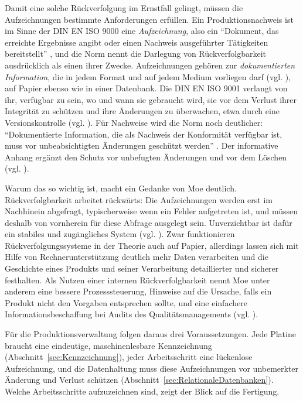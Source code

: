 Damit eine solche Rückverfolgung im Ernstfall gelingt, müssen die
Aufzeichnungen bestimmte Anforderungen erfüllen. Ein Produktionsnachweis ist im
Sinne der DIN EN ISO 9000 eine \emph{Aufzeichnung}, also ein \enquote{Dokument,
das erreichte Ergebnisse angibt oder einen Nachweis ausgeführter Tätigkeiten
bereitstellt} \cite[S.~26]{DINENISO9000_2026}, und die Norm nennt die Darlegung
von Rückverfolgbarkeit ausdrücklich als einen ihrer Zwecke. Aufzeichnungen
gehören zur \emph{dokumentierten Information}, die in jedem Format und auf jedem
Medium vorliegen darf (vgl. \cite[S.~26]{DINENISO9000_2026}), auf Papier ebenso
wie in einer Datenbank. Die DIN EN ISO 9001 verlangt von ihr, verfügbar zu sein,
wo und wann sie gebraucht wird, sie vor dem Verlust ihrer Integrität zu schützen
und ihre Änderungen zu überwachen, etwa durch eine Versionskontrolle (vgl.
\cite[S.~27]{DINENISO9001_2026}). Für Nachweise wird die Norm noch deutlicher:
\enquote{Dokumentierte Information, die als Nachweis der Konformität verfügbar
ist, muss vor unbeabsichtigten Änderungen geschützt werden}
\cite[S.~28]{DINENISO9001_2026}. Der informative Anhang ergänzt den Schutz vor
unbefugten Änderungen und vor dem Löschen (vgl.
\cite[S.~48]{DINENISO9001_2026}).

Warum das so wichtig ist, macht ein Gedanke von Moe deutlich. Rückverfolgbarkeit
arbeitet rückwärts: Die Aufzeichnungen werden erst im Nachhinein abgefragt,
typischerweise wenn ein Fehler aufgetreten ist, und müssen deshalb von vornherein
für diese Abfrage ausgelegt sein. Unverzichtbar ist dafür ein stabiles und
zugängliches System (vgl. \cite[S.~212]{moePerspectivesTraceabilityFood1998}). 
Zwar funktionieren Rückverfolgungssysteme in der Theorie auch auf Papier, 
allerdings lassen sich mit Hilfe von Rechnerunterstützung deutlich mehr Daten verarbeiten 
und die Geschichte eines Produkts und
seiner Verarbeitung detaillierter und sicherer festhalten. Als Nutzen einer internen
Rückverfolgbarkeit nennt Moe unter anderem eine bessere Prozesssteuerung,
Hinweise auf die Ursache, falls ein Produkt nicht den Vorgaben entsprechen sollte, und
eine einfachere Informationsbeschaffung bei Audits des Qualitätsmanagements
(vgl. \cite[S.~213]{moePerspectivesTraceabilityFood1998}).

Für die Produktionsverwaltung folgen daraus drei Voraussetzungen. Jede Platine
braucht eine eindeutige, maschinenlesbare Kennzeichnung
(Abschnitt~\ref{sec:Kennzeichnung}), jeder Arbeitsschritt eine lückenlose
Aufzeichnung, und die Datenhaltung muss diese Aufzeichnungen vor unbemerkter
Änderung und Verlust schützen (Abschnitt~\ref{sec:RelationaleDatenbanken}).
Welche Arbeitsschritte aufzuzeichnen sind, zeigt der Blick auf die Fertigung.

